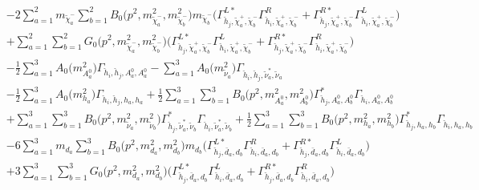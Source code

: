 \begin{itemize}
\begin{align}
 &-2 \sum_{a=1}^{2}m_{\tilde{\chi}^-_{{a}}} \sum_{b=1}^{2}{B_0\Big(p^{2},m^2_{\tilde{\chi}^-_{{a}}},m^2_{\tilde{\chi}^-_{{b}}}\Big)} m_{\tilde{\chi}^-_{{b}}} \Big({\Gamma^{L*}_{\check{h}_{{j}},\tilde{\chi}^+_{{a}},\tilde{\chi}^-_{{b}}}} {\Gamma^R_{\check{h}_{{i}},\tilde{\chi}^+_{{a}},\tilde{\chi}^-_{{b}}}}  + {\Gamma^{R*}_{\check{h}_{{j}},\tilde{\chi}^+_{{a}},\tilde{\chi}^-_{{b}}}} {\Gamma^L_{\check{h}_{{i}},\tilde{\chi}^+_{{a}},\tilde{\chi}^-_{{b}}}} \Big)  \nonumber \\ 
 &+\sum_{a=1}^{2}\sum_{b=1}^{2}{G_0\Big(p^{2},m^2_{\tilde{\chi}^-_{{a}}},m^2_{\tilde{\chi}^-_{{b}}}\Big)} \Big({\Gamma^{L*}_{\check{h}_{{j}},\tilde{\chi}^+_{{a}},\tilde{\chi}^-_{{b}}}} {\Gamma^L_{\check{h}_{{i}},\tilde{\chi}^+_{{a}},\tilde{\chi}^-_{{b}}}}  + {\Gamma^{R*}_{\check{h}_{{j}},\tilde{\chi}^+_{{a}},\tilde{\chi}^-_{{b}}}} {\Gamma^R_{\check{h}_{{i}},\tilde{\chi}^+_{{a}},\tilde{\chi}^-_{{b}}}} \Big)\nonumber \\ 
 &-\frac{1}{2} \sum_{a=1}^{3}{A_0\Big(m^2_{A^0_{{a}}}\Big)} {\Gamma_{\check{h}_{{i}},\check{h}_{{j}},A^0_{{a}},A^0_{{a}}}}  - \sum_{a=1}^{3}{A_0\Big(m^2_{\tilde{\nu}_{{a}}}\Big)} {\Gamma_{\check{h}_{{i}},\check{h}_{{j}},\tilde{\nu}^*_{{a}},\tilde{\nu}_{{a}}}}  \nonumber \\ 
 &-\frac{1}{2} \sum_{a=1}^{3}{A_0\Big(m^2_{h_{{a}}}\Big)} {\Gamma_{\check{h}_{{i}},\check{h}_{{j}},h_{{a}},h_{{a}}}}  +\frac{1}{2} \sum_{a=1}^{3}\sum_{b=1}^{3}{B_0\Big(p^{2},m^2_{A^0_{{a}}},m^2_{A^0_{{b}}}\Big)} {\Gamma^*_{\check{h}_{{j}},A^0_{{a}},A^0_{{b}}}} {\Gamma_{\check{h}_{{i}},A^0_{{a}},A^0_{{b}}}}  \nonumber \\ 
 &+\sum_{a=1}^{3}\sum_{b=1}^{3}{B_0\Big(p^{2},m^2_{\tilde{\nu}_{{a}}},m^2_{\tilde{\nu}_{{b}}}\Big)} {\Gamma^*_{\check{h}_{{j}},\tilde{\nu}^*_{{a}},\tilde{\nu}_{{b}}}} {\Gamma_{\check{h}_{{i}},\tilde{\nu}^*_{{a}},\tilde{\nu}_{{b}}}} +\frac{1}{2} \sum_{a=1}^{3}\sum_{b=1}^{3}{B_0\Big(p^{2},m^2_{h_{{a}}},m^2_{h_{{b}}}\Big)} {\Gamma^*_{\check{h}_{{j}},h_{{a}},h_{{b}}}} {\Gamma_{\check{h}_{{i}},h_{{a}},h_{{b}}}}  \nonumber \\ 
 &-6 \sum_{a=1}^{3}m_{d_{{a}}} \sum_{b=1}^{3}{B_0\Big(p^{2},m^2_{d_{{a}}},m^2_{d_{{b}}}\Big)} m_{d_{{b}}} \Big({\Gamma^{L*}_{\check{h}_{{j}},\bar{d}_{{a}},d_{{b}}}} {\Gamma^R_{\check{h}_{{i}},\bar{d}_{{a}},d_{{b}}}}  + {\Gamma^{R*}_{\check{h}_{{j}},\bar{d}_{{a}},d_{{b}}}} {\Gamma^L_{\check{h}_{{i}},\bar{d}_{{a}},d_{{b}}}} \Big)  \nonumber \\ 
 &+3 \sum_{a=1}^{3}\sum_{b=1}^{3}{G_0\Big(p^{2},m^2_{d_{{a}}},m^2_{d_{{b}}}\Big)} \Big({\Gamma^{L*}_{\check{h}_{{j}},\bar{d}_{{a}},d_{{b}}}} {\Gamma^L_{\check{h}_{{i}},\bar{d}_{{a}},d_{{b}}}}  + {\Gamma^{R*}_{\check{h}_{{j}},\bar{d}_{{a}},d_{{b}}}} {\Gamma^R_{\check{h}_{{i}},\bar{d}_{{a}},d_{{b}}}} \Big) \nonumber \\ 

\end{align}
\end{itemize}
